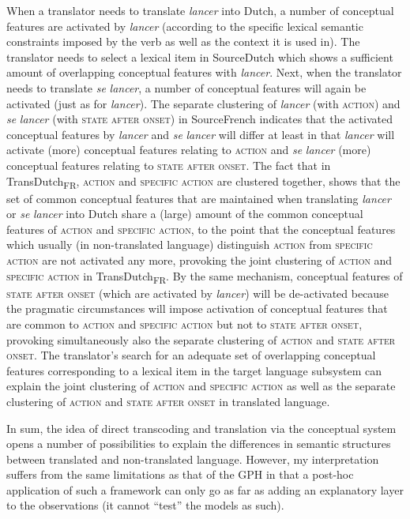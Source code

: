 When a translator needs to translate \textit{lancer} into Dutch, a number of conceptual features are activated by \textit{lancer} (according to the specific lexical semantic constraints imposed by the verb as well as the context it is used in). The translator needs to select a lexical item in SourceDutch which shows a sufficient amount of overlapping conceptual features with \textit{lancer}. Next, when the translator needs to translate \textit{se} \textit{lancer}, a number of conceptual features will again be activated (just as for \textit{lancer}). The separate clustering of \textit{lancer} (with \textsc{action}) and \textit{se} \textit{lancer} (with \textsc{state after onset}) in SourceFrench indicates that the activated conceptual features by \textit{lancer} and \textit{se} \textit{lancer} will differ at least in that \textit{lancer} will activate (more) conceptual features relating to \textsc{action} and \textit{se} \textit{lancer} (more) conceptual features relating to \textsc{state after onset}. The fact that in TransDutch\textsubscript{FR}, \textsc{action} and \textsc{specific} \textsc{action} are clustered together, shows that the set of common conceptual features that are maintained when translating \textit{lancer} or \textit{se} \textit{lancer} into Dutch share a (large) amount of the common conceptual features of \textsc{action} and \textsc{specific} \textsc{action}, to the point that the conceptual features which usually (in non-translated language) distinguish \textsc{action} from \textsc{specific} \textsc{action} are not activated any more, provoking the joint clustering of \textsc{action} and \textsc{specific} \textsc{action} in TransDutch\textsubscript{FR}. By the same mechanism, conceptual features of \textsc{state after onset} (which are activated by \textit{lancer}) will be de-activated because the pragmatic circumstances will impose activation of conceptual features that are common to \textsc{action} and \textsc{specific} \textsc{action} but not to \textsc{state after onset}, provoking simultaneously also the separate clustering of \textsc{action} and \textsc{state after onset}. The translator’s search for an adequate set of overlapping conceptual features corresponding to a lexical item in the target language subsystem can explain the joint clustering of \textsc{action} and \textsc{specific} \textsc{action} as well as the separate clustering of \textsc{action} and \textsc{state after onset} in translated language.

In sum, the idea of direct transcoding and translation via the conceptual system opens a number of possibilities to explain the differences in semantic structures between translated and non-translated language. However, my interpretation suffers from the same limitations as that of the GPH in that a post-hoc application of such a framework can only go as far as adding an explanatory layer to the observations (it cannot ``test'' the models as such).


